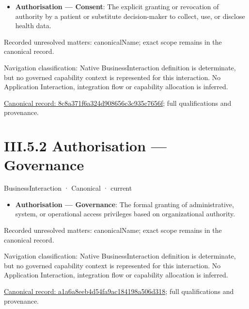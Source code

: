 \begin{itemize}


\item \textbf{Authorisation — Consent}: The explicit granting or revocation of authority by a patient or substitute decision-maker to collect, use, or disclose health data.

\end{itemize}

{\small Recorded unresolved matters: canonicalName; exact scope remains in the canonical record.}\par
{\small Navigation classification: Native BusinessInteraction definition is determinate, but no governed capability context is represented for this interaction. No Application Interaction, integration flow or capability allocation is inferred.}\par
{\footnotesize \href{../../../../../../../../continuum/business/business-interaction/8c8a371f6a324d908656c3c935c7656f.md}{Canonical record: 8c8a371f6a324d908656c3c935c7656f}; full qualifications and provenance.}\par
\section*{III.5.2 Authorisation — Governance}
\label{navigation:III.5.2}

\label{element:a1a6a8eeb4d54fa9ac184198a506d318}
{\small BusinessInteraction · Canonical · current}\par

\begin{itemize}


\item \textbf{Authorisation — Governance}: The formal granting of administrative, system, or operational access privileges based on organizational authority.

\end{itemize}

{\small Recorded unresolved matters: canonicalName; exact scope remains in the canonical record.}\par
{\small Navigation classification: Native BusinessInteraction definition is determinate, but no governed capability context is represented for this interaction. No Application Interaction, integration flow or capability allocation is inferred.}\par
{\footnotesize \href{../../../../../../../../continuum/business/business-interaction/a1a6a8eeb4d54fa9ac184198a506d318.md}{Canonical record: a1a6a8eeb4d54fa9ac184198a506d318}; full qualifications and provenance.}\par
